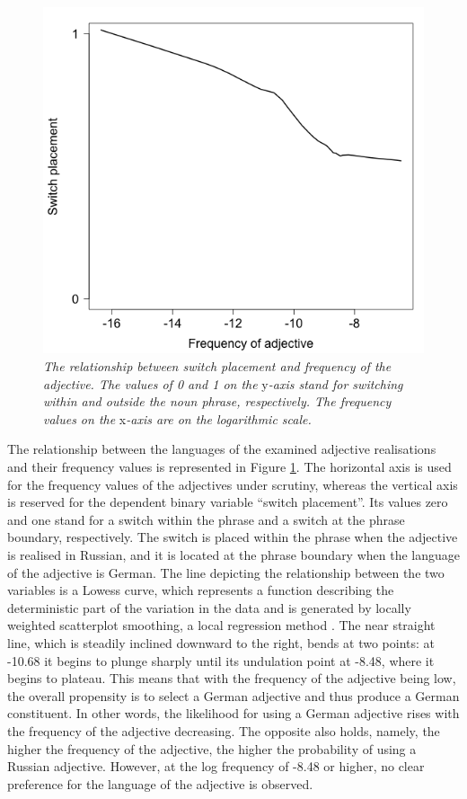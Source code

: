 \begin{figure}
	\centering
    	\includegraphics[scale=0.5]{figures/4-Fr_A_ru.png}
	\caption{\textit{The relationship between switch placement and frequency of the adjective. The values of 0 and 1 on the} y\textit{-axis stand for switching within and outside the noun phrase, respectively. The frequency values on the} x\textit{-axis are on the logarithmic scale.}}
	\label{fig:4:adj_ru}
\end{figure}

The relationship between the languages of the examined adjective realisations and their frequency values is represented in Figure \ref{fig:4:adj_ru}. The horizontal axis is used for the frequency values of the adjectives under scrutiny, whereas the vertical axis is reserved for the dependent binary variable “switch placement”. Its values zero and one stand for a switch within the phrase and a switch at the phrase boundary, respectively. The switch is placed within the phrase when the adjective is realised in Russian, and it is located at the phrase boundary when the language of the adjective is German. The line depicting the relationship between the two variables is a Lowess curve, which represents a function describing the deterministic part of the variation in the data and is generated by locally weighted scatterplot smoothing, a local regression method \citep{lowess}. The near straight line, which is steadily inclined downward to the right, bends at two points: at -10.68 it begins to plunge sharply until its undulation point at -8.48, where it begins to plateau. This means that with the frequency of the adjective being low, the overall propensity is to select a German adjective and thus produce a German constituent. In other words, the likelihood for using a German adjective rises with the frequency of the adjective decreasing. The opposite also holds, namely, the higher the frequency of the adjective, the higher the probability of using a Russian adjective. However, at the log frequency of -8.48 or higher, no clear preference for the language of the adjective is observed.

